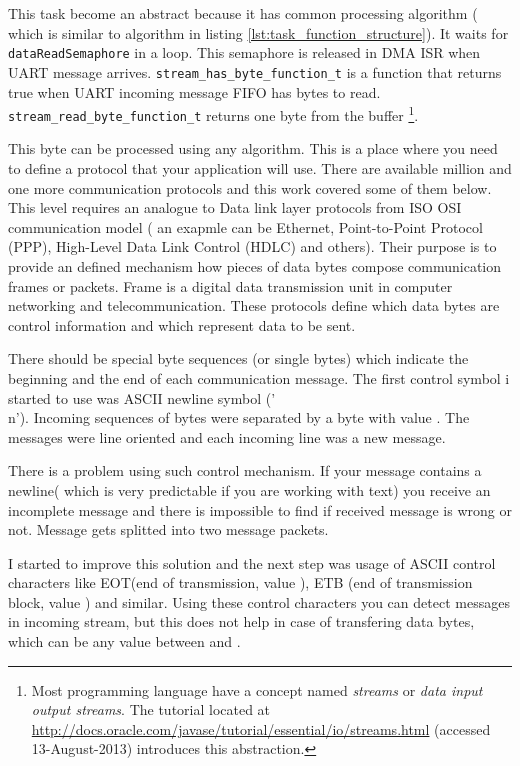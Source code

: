 This task become an abstract because it has common processing algorithm ( which
is similar to algorithm in listing \ref{lst:task_function_structure}).
It waits for \texttt{dataReadSemaphore} in a loop. 
This semaphore is released in DMA \gls{ISR} when UART message arrives.
\texttt{stream_has_byte_function_t} is a function that returns true
when UART incoming message FIFO has bytes to read. 
\texttt{stream_read_byte_function_t} returns one byte from the buffer
\footnote{Most programming language have a concept named \textit{streams} or
\textit{data input output streams}. The tutorial located at
\url{http://docs.oracle.com/javase/tutorial/essential/io/streams.html}
(accessed 13-August-2013) introduces this abstraction.}.

This byte can be processed using any algorithm. This is a place where you need
to define a protocol that your application will use.
There are available million and one more communication protocols and this work
covered some of them below. 
This level requires an analogue to  Data link
layer protocols from ISO OSI communication model 
( an exapmle can be Ethernet, Point-to-Point Protocol (PPP), High-Level Data
Link Control (HDLC)  and others). 
Their purpose is to provide an defined
mechanism how pieces of data bytes compose communication frames or packets. 
Frame is a digital data transmission unit in computer networking and
telecommunication. These protocols define which data bytes are control
information and which represent data to be sent.

There should be special byte sequences (or single bytes) which indicate the 
beginning and the end of each communication message. 
The first control symbol i started to use was ASCII newline symbol ('\\n').
Incoming sequences of bytes were separated by a byte with value .
The messages were line oriented and each incoming line was a new message.

There is a problem using such control mechanism. If your message contains a 
newline( which is very predictable if you are working with text) you receive an
incomplete message and there is impossible to find if received message is wrong
or not. Message gets splitted into two message packets.

I started to improve this solution and the next step was usage of ASCII control
characters like EOT(end of transmission, value ), ETB (end of
transmission block, value ) and similar. Using these  control
characters you can detect messages in incoming stream, but this does not help in case of transfering data
bytes, which can be any value between  and .


